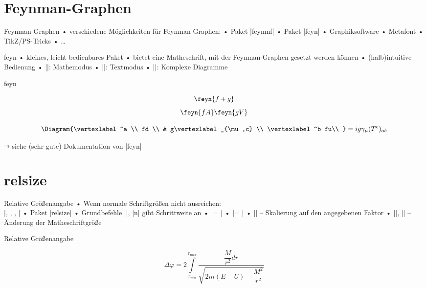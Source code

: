 \section{Feynman-Graphen}
\begin{frame}[fragile]{Feynman-Graphen}
• verschiedene Möglichkeiten für Feynman-Graphen:
• Paket |feynmf|
• Paket |feyn|
• Graphiksoftware
• Metafont
• TikZ/PS-Tricks
• …
\•
\end{frame}

\begin{frame}[fragile]{feyn}
• kleines, leicht bedienbares Paket
• bietet eine Matheschrift, mit der Feynman-Graphen gesetzt werden können
• (halb)intuitive Bedienung
• |\feyn|: Mathemodus
• |\Feyn|: Textmodus
• |\Diagram|: Komplexe Diagramme
\•
\end{frame}

\begin{frame}[fragile]{feyn}
\begin{LTXexample}
\[\feyn{f+g}\]
\[\feyn{fA} \feyn{gV}\]
\end{LTXexample}
\begin{LTXexample}
\[\Diagram{\vertexlabel^a \\
  fd \\
    & g\vertexlabel_{\mu,c} \\
  \vertexlabel^b fu\\
}
= ig\gamma_\mu (T^c)_{ab}\]
\end{LTXexample}
\pause
⇒ siehe (sehr gute) Dokumentation von |feyn|
\end{frame}

\section{relsize}
\begin{frame}[fragile]{Relative Größenangabe}
• Wenn normale Schriftgrößen nicht ausreichen:\\%
|\displaystyle, \textstyle, \scriptstyle, \scripscriptstyle|
• Paket |relsize|
• Grundbefehle ||, |n| gibt Schrittweite an
• |\larger = |
• |\smaller = |
• || – Skalierung auf den angegebenen Faktor
• |\mathsmaller|, |\mathlarger| – Änderung der Matheschriftgröße
\•
\end{frame}

\begin{frame}[fragile]{Relative Größenangabe}
\begin{LTXexample}[pos=b]
\[\Delta \varphi = 2
\int\limits_{r_{\min}}^{r_{\max}} \frac{ \dfrac{M}{r^2} dr} 
{\sqrt{2m (E-U) - \dfrac{M^2}{r^2}}}
\]
\end{LTXexample}
\end{frame}

